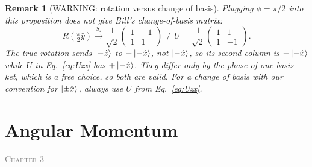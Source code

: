\documentclass{article}
\newtheorem{remark}{Remark}
\newcommand{\chapterstart}[1]{\noindent\hfill{\small\scshape\textcolor{gray}{Chapter #1}}\par}
\begin{document}
\begin{remark}[WARNING: rotation versus change of basis]
    Plugging $\phi = \pi/2$ into this proposition does \emph{not} give Bill's change-of-basis matrix:
    \[R\left(\tfrac{\pi}{2}\hat{y}\right) \xrightarrow{S_z} \frac{1}{\sqrt{2}}\begin{pmatrix} 1 & -1 \\ 1 & 1 \end{pmatrix} \neq U = \frac{1}{\sqrt{2}}\begin{pmatrix} 1 & 1 \\ 1 & -1 \end{pmatrix}.\]
    The true rotation sends $\ket{-\hat{z}}$ to $-\ket{-\hat{x}}$, not $\ket{-\hat{x}}$, so its second column is $-\ket{-\hat{x}}$ while $U$ in Eq.~\eqref{eq:Uzx} has $+\ket{-\hat{x}}$. They differ only by the phase of one basis ket, which is a free choice, so both are valid. For a change of basis with our convention for $\ket{\pm\hat{x}}$, always use $U$ from Eq.~\eqref{eq:Uzx}.
\end{remark}


\section{Angular Momentum}
\chapterstart{3}
\end{document}
